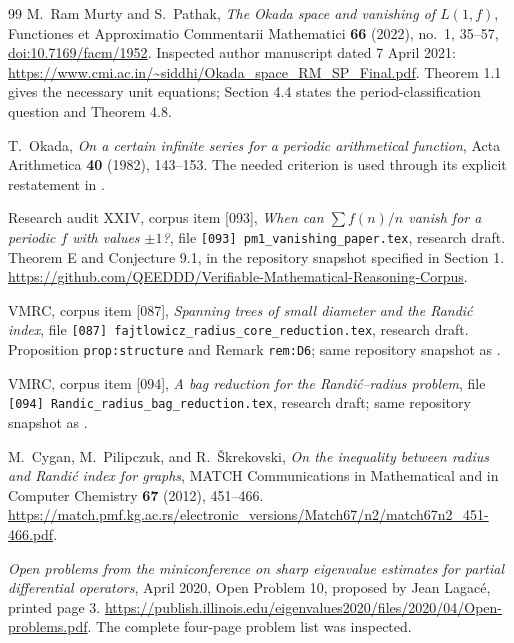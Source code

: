 \documentclass[11pt,a4paper]{article}
\theoremstyle{definition}\newtheorem{definition}[theorem]{Definition}
\theoremstyle{remark}\newtheorem{remark}[theorem]{Remark}
\begin{document}
\begin{thebibliography}{99}\small
{}
M.~Ram Murty and S.~Pathak,
\emph{The Okada space and vanishing of $L(1,f)$},
Functiones et Approximatio Commentarii Mathematici
\textbf{66} (2022), no.~1, 35--57,
\href{https://doi.org/10.7169/facm/1952}{doi:10.7169/facm/1952}.
Inspected author manuscript dated 7 April 2021:
\url{https://www.cmi.ac.in/~siddhi/Okada_space_RM_SP_Final.pdf}.
Theorem 1.1 gives the necessary unit equations; Section 4.4 states the
period-classification question and Theorem 4.8.

T.~Okada, \emph{On a certain infinite series for a periodic arithmetical
function}, Acta Arithmetica \textbf{40} (1982), 143--153.
The needed criterion is used through its explicit restatement in
\cite[Theorem 1.1]{MP2022}.

Research audit XXIV, corpus item [093],
\emph{When can $\sum f(n)/n$ vanish for a periodic $f$ with values $\pm1$?},
file \texttt{[093] pm1\_vanishing\_paper.tex}, research draft.
Theorem E and Conjecture 9.1, in the repository snapshot specified
in Section 1.
\url{https://github.com/QEEDDD/Verifiable-Mathematical-Reasoning-Corpus}.

VMRC, corpus item [087],
\emph{Spanning trees of small diameter and the Randi\'c index},
file \texttt{[087] fajtlowicz\_radius\_core\_reduction.tex}, research draft.
Proposition \texttt{prop:structure} and Remark \texttt{rem:D6};
same repository snapshot as \cite{Corpus093}.

VMRC, corpus item [094], \emph{A bag reduction for the Randi\'c--radius problem},
file \texttt{[094] Randic\_radius\_bag\_reduction.tex}, research draft;
same repository snapshot as \cite{Corpus093}.

M.~Cygan, M.~Pilipczuk, and R.~\v{S}krekovski,
\emph{On the inequality between radius and Randi\'c index for graphs},
MATCH Communications in Mathematical and in Computer Chemistry
\textbf{67} (2012), 451--466.
\url{https://match.pmf.kg.ac.rs/electronic_versions/Match67/n2/match67n2_451-466.pdf}.

\emph{Open problems from the miniconference on sharp eigenvalue estimates
for partial differential operators}, April 2020,
Open Problem 10, proposed by Jean Lagac\'e, printed page 3.
\url{https://publish.illinois.edu/eigenvalues2020/files/2020/04/Open-problems.pdf}.
The complete four-page problem list was inspected.


\end{thebibliography}
\end{document}
